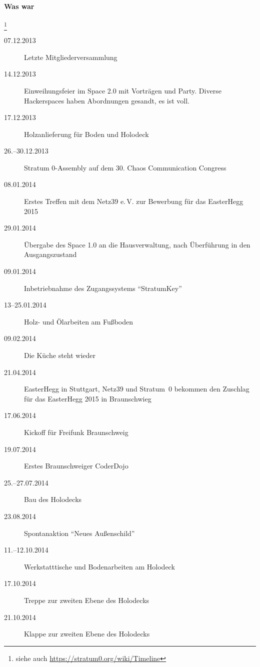 \documentclass[a4paper,12pt]{scrartcl}
\begin{document}
\paragraph{Was war}
\hspace{-2ex}\footnote{siehe auch \url{https://stratum0.org/wiki/Timeline}}
\begin{description}
  \item[07.12.2013] Letzte Mitgliederversammlung
  \item[14.12.2013] Einweihungsfeier im Space 2.0 mit Vorträgen und Party.
    Diverse Hackerspaces haben Abordnungen gesandt, es ist voll.
  \item[17.12.2013] Holzanlieferung für Boden und Holodeck
  \item[26.--30.12.2013] Stratum 0-Assembly auf dem 30. Chaos Communication
    Congress
  \item[08.01.2014] Erstes Treffen mit dem Netz39 e.\,V. zur Bewerbung für das
    EasterHegg 2015
  \item[29.01.2014] Übergabe des Space 1.0 an die Hausverwaltung, nach
    Überführung in den Ausgangszustand
  \item[09.01.2014] Inbetriebnahme des Zugangssystems "`StratumKey"'
  \item[13--25.01.2014] Holz- und Ölarbeiten am Fußboden
  \item[09.02.2014] Die Küche steht wieder
  \item[21.04.2014] EasterHegg in Stuttgart, Netz39 und Stratum~0 bekommen den
    Zuschlag für das EasterHegg 2015 in Braunschwieg
  \item[17.06.2014] Kickoff für Freifunk Braunschweig
  \item[19.07.2014] Erstes Braunschweiger CoderDojo
  \item[25.--27.07.2014] Bau des Holodecks
  \item[23.08.2014] Spontanaktion "`Neues Außenschild"'
  \item[11.--12.10.2014] Werkstatttische und Bodenarbeiten am Holodeck
  \item[17.10.2014] Treppe zur zweiten Ebene des Holodecks
  \item[21.10.2014] Klappe zur zweiten Ebene des Holodecks 
\end{description}
\end{document}
